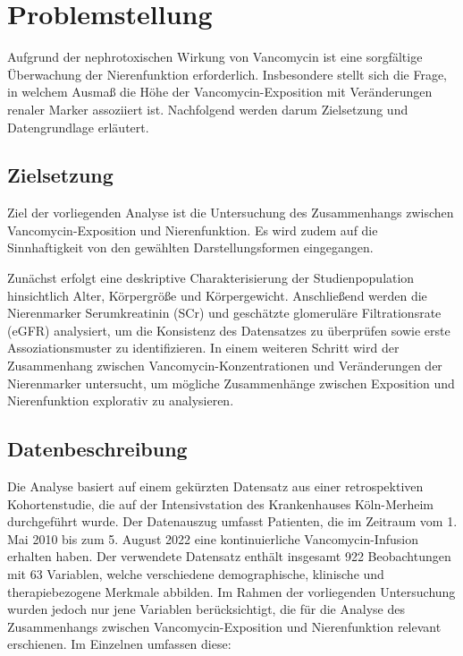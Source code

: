 \documentclass[a4paper,12pt]{article}
\begin{document}
\section{Problemstellung}\label{sec:Problem}
Aufgrund der nephrotoxischen Wirkung von Vancomycin ist eine sorgfältige Überwachung der Nierenfunktion erforderlich. Insbesondere stellt sich die Frage, in welchem Ausmaß die Höhe der Vancomycin-Exposition mit Veränderungen renaler Marker assoziiert ist. Nachfolgend werden darum Zielsetzung und Datengrundlage erläutert. 


\subsection{Zielsetzung} \label{sec:Ziel}
Ziel der vorliegenden Analyse ist die Untersuchung des Zusammenhangs zwischen Vancomycin-Exposition und Nierenfunktion. Es wird zudem auf die Sinnhaftigkeit von den gewählten Darstellungsformen eingegangen.

Zunächst erfolgt eine deskriptive Charakterisierung der Studienpopulation hinsichtlich Alter, Körpergröße und Körpergewicht. Anschließend werden die Nierenmarker Serumkreatinin (SCr) und geschätzte glomeruläre Filtrationsrate (eGFR) analysiert, um die Konsistenz des Datensatzes zu überprüfen sowie erste Assoziationsmuster zu identifizieren.
In einem weiteren Schritt wird der Zusammenhang zwischen Vancomycin-Konzentrationen und Veränderungen der Nierenmarker untersucht, um mögliche Zusammenhänge zwischen Exposition und Nierenfunktion explorativ zu analysieren. 


\subsection{Datenbeschreibung}\label{sec:Daten}
Die Analyse basiert auf einem gekürzten Datensatz aus einer retrospektiven Kohortenstudie, die auf der Intensivstation des Krankenhauses Köln-Merheim durchgeführt wurde. Der Datenauszug umfasst Patienten, die im Zeitraum vom 1. Mai 2010 bis zum 5. August 2022 eine kontinuierliche Vancomycin-Infusion erhalten haben. Der verwendete Datensatz enthält insgesamt 922 Beobachtungen mit 63 Variablen, welche verschiedene demographische, klinische und therapiebezogene Merkmale abbilden. Im Rahmen der vorliegenden Untersuchung wurden jedoch nur jene Variablen berücksichtigt, die für die Analyse des Zusammenhangs zwischen Vancomycin-Exposition und Nierenfunktion relevant erschienen. Im Einzelnen umfassen diese:
\end{document}
